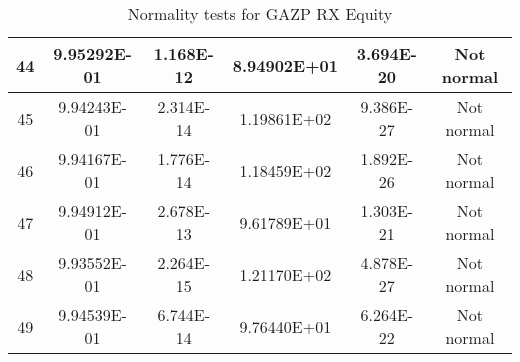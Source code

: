 \begin{table}[h]
\begin{tabular}{|c|c|c|c|c|c|}
		44 & 9.95292E-01 & 1.168E-12 & 8.94902E+01 & 3.694E-20 & Not normal\\\hline
		45 & 9.94243E-01 & 2.314E-14 & 1.19861E+02 & 9.386E-27 & Not normal\\\hline
		46 & 9.94167E-01 & 1.776E-14 & 1.18459E+02 & 1.892E-26 & Not normal\\\hline
		47 & 9.94912E-01 & 2.678E-13 & 9.61789E+01 & 1.303E-21 & Not normal\\\hline
		48 & 9.93552E-01 & 2.264E-15 & 1.21170E+02 & 4.878E-27 & Not normal\\\hline
		49 & 9.94539E-01 & 6.744E-14 & 9.76440E+01 & 6.264E-22 & Not normal\\\hline
	\end{tabular}
	\caption{Normality tests for GAZP RX Equity}
	\label{tab:normality_tests_GAZP_RX}
\end{table}
